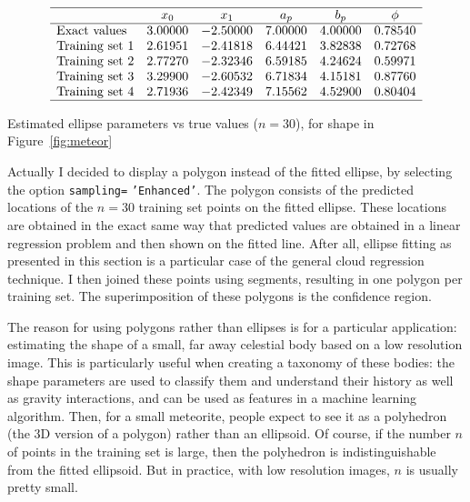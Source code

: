 \documentclass[oneside,10pt]{book}
\renewcommand{\arraystretch}{1.4} %
\begin{document}
\renewcommand{\arraystretch}{1.2} %
\begin{table}[H]
\[
\begin{array}{lccccc}
\hline
   & x_0 & x_1  & a_p & b_p & \phi  \\
\hline
\text{Exact values} & 3.00000 & -2.50000 & 7.00000 & 4.00000 & 0.78540\\
\text{Training set } 1 & 2.61951 & -2.41818 & 6.44421 & 3.82838 & 0.72768 \\
\text{Training set } 2 & 2.77270 & -2.32346 & 6.59185 & 4.24624 & 0.59971 \\
\text{Training set } 3 & 3.29900 & -2.60532 & 6.71834 & 4.15181 & 0.87760 \\
\text{Training set } 4 & 2.71936 & -2.42349 & 7.15562 & 4.52900 & 0.80404 \\
\hline
\end{array}
\]
\caption{\label{ellipar} Estimated ellipse parameters vs true values ($n=30$), for shape in Figure~\ref{fig:meteor}}
\end{table}
\renewcommand{\arraystretch}{1.0} %

Actually I decided to display a polygon instead of the fitted ellipse, by selecting the option \texttt{sampling=} \texttt{'Enhanced'}. The polygon consists of the predicted locations of the $n=30$ training set points on the fitted ellipse. These locations are obtained in the exact same way that predicted values are obtained in a linear regression problem and then shown on the fitted line. After all, ellipse fitting as presented in this section is a particular case of the general cloud regression technique. I then joined these points using segments, resulting in one polygon per training set. The superimposition of these polygons is the confidence region. 

The reason for using polygons rather than ellipses is for a particular application: estimating the shape of a small, far away celestial body based on a low resolution image.  This is particularly useful when creating a taxonomy of these bodies: the shape parameters are used to classify them and understand their history as well as gravity interactions, and can be used as features
 in a machine learning algorithm. Then, for a small meteorite, people expect to see it as a polyhedron (the 3D version of a polygon) rather than an ellipsoid. Of course, if the number $n$ of points in the training set is large, then the polyhedron is indistinguishable  from the fitted ellipsoid. But in practice, with low resolution images,  $n$ is usually pretty small. 
\end{document}
